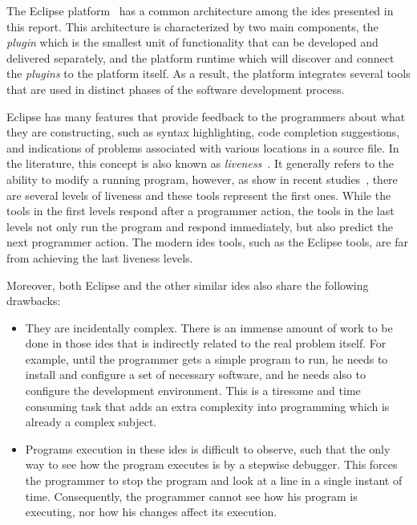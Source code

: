 The Eclipse platform~\cite{DesRivieres2004} has a common architecture among the \ac{ide}s presented in this report. This architecture is characterized by two main components, the \textit{plugin} which is the smallest unit of functionality that can be developed and delivered separately, and the platform runtime which will discover and connect the \textit{plugins} to the platform itself. As a result, the platform integrates several tools that are used in distinct phases of the software development process.

Eclipse has many features that provide feedback to the programmers about what they are constructing, such as syntax highlighting, code completion suggestions, and indications of problems associated with various locations in a source file. In the literature, this concept is also known as \textit{liveness}~\cite{alpern1985defining}. It generally refers to the ability to modify a running program, however, as show in recent studies~\cite{tanimoto2013perspective}, there are several levels of liveness and these tools represent the first ones. While the tools in the first levels respond after a programmer action, the tools in the last levels not only run the program and respond immediately, but also predict the next programmer action. The modern \ac{ide}s tools, such as the Eclipse tools, are far from achieving the last liveness levels.

Moreover, both Eclipse and the other similar \ac{ide}s also share the following drawbacks:
\begin{itemize}
	\item They are incidentally complex. There is an immense amount of work to be done in those \ac{ide}s that is indirectly related to the real problem itself. For example, until the programmer gets a simple program to run, he needs to install and configure a set of necessary software, and he needs also to configure the development environment. This is a tiresome and time consuming task that adds an extra complexity into programming which is already a complex subject.

	\item Programs execution in these \ac{ide}s is difficult to observe, such that the only way to see how the program executes is by a stepwise debugger. This forces the programmer to stop the program and look at a line in a single instant of time. Consequently, the programmer cannot see how his program is executing, nor how his changes affect its execution.
\end{itemize}
